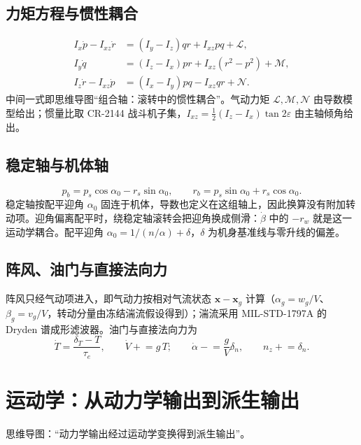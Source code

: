 \documentclass[UTF8,a4paper,11pt,fontset=fandol,scheme=plain]{ctexart}
\begin{document}
\subsection{力矩方程与惯性耦合}
\begin{equation}
\begin{aligned}
I_x\dot p-I_{xz}\dot r&=(I_y-I_z)qr+I_{xz}pq+\mathcal L,\\
I_y\dot q&=(I_z-I_x)pr+I_{xz}(r^2-p^2)+\mathcal M,\\
I_z\dot r-I_{xz}\dot p&=(I_x-I_y)pq-I_{xz}qr+\mathcal N .
\end{aligned}
\end{equation}
中间一式即思维导图“组合轴：滚转中的惯性耦合”。气动力矩 \(\mathcal L,\mathcal M,\mathcal N\) 由导数模型给出；惯量比取 CR-2144 战斗机子集，\(I_{xz}=\tfrac12(I_z-I_x)\tan2\varepsilon\) 由主轴倾角给出。

\subsection{稳定轴与机体轴}
\begin{equation}
p_b=p_s\cos\alpha_0-r_s\sin\alpha_0,\qquad r_b=p_s\sin\alpha_0+r_s\cos\alpha_0 .
\end{equation}
稳定轴按配平迎角 \(\alpha_0\) 固连于机体，导数也定义在这组轴上，因此换算没有附加转动项。迎角偏离配平时，绕稳定轴滚转会把迎角换成侧滑：\(\dot\beta\) 中的 \(-r_w\) 就是这一运动学耦合。配平迎角 \(\alpha_0=1/(n/\alpha)+\delta\)，\(\delta\) 为机身基准线与零升线的偏差。

\subsection{阵风、油门与直接法向力}
阵风只经气动项进入，即气动力按相对气流状态 \(\mathbf x-\mathbf x_g\) 计算（\(\alpha_g=w_g/V\)、\(\beta_g=v_g/V\)，转动分量由冻结湍流假设得到）；湍流采用 MIL-STD-1797A 的 Dryden 谱成形滤波器。油门与直接法向力为
\begin{equation}
\dot T=\frac{\delta_T-T}{\tau_e},\qquad \dot V\mathrel{+}=g\,T;\qquad \dot\alpha\mathrel{-}=\frac{g}{V}\delta_n,\qquad n_z\mathrel{+}=\delta_n .
\end{equation}

\section{运动学：从动力学输出到派生输出}
\label{sec:kin}
思维导图：“动力学输出经过运动学变换得到派生输出”。
\end{document}
